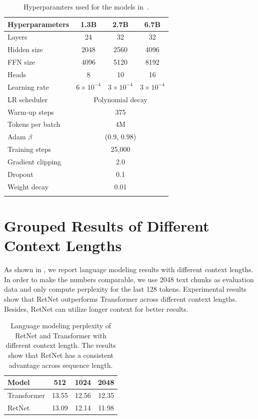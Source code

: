 \documentclass{article}
\newcommand\our{RetNet}
\begin{document}
\begin{table}[ht]
\centering
\begin{tabular}{lccc}
\toprule
\bf Hyperparameters & \bf 1.3B & \bf 2.7B & \bf 6.7B \\
\midrule
Layers & 24 & 32 & 32 \\
Hidden size & 2048 & 2560 & 4096 \\
FFN size & 4096 & 5120 & 8192 \\
Heads & 8 & 10 & 16 \\
\midrule
Learning rate & $6\times10^{-4}$ & $3\times10^{-4}$ & $3\times10^{-4}$ \\
LR scheduler & \multicolumn{3}{c}{Polynomial decay} \\
Warm-up steps & \multicolumn{3}{c}{375} \\
Tokens per batch & \multicolumn{3}{c}{4M} \\
Adam $\beta$ & \multicolumn{3}{c}{(0.9, 0.98)} \\
Training steps & \multicolumn{3}{c}{25,000} \\
\midrule
Gradient clipping & \multicolumn{3}{c}{2.0} \\
Dropout & \multicolumn{3}{c}{0.1} \\
Weight decay & \multicolumn{3}{c}{0.01} \\
\bottomrule
\\
\end{tabular}
\caption{Hyperparamters used for the models in~.
}
\end{table}

\section{Grouped Results of Different Context Lengths}
\label{app:ppl:length}

As shown in , we report language modeling results with different context lengths.
In order to make the numbers comparable, we use 2048 text chunks as evaluation data and only compute perplexity for the last 128 tokens.
Experimental results show that \our{} outperforms Transformer across different context lengths.
Besides, \our{} can utilize longer context for better results.

\begin{table}[ht]
\centering
\begin{tabular}{lccc}
\toprule
\bf Model & \bf 512 & \bf 1024 & \bf 2048 \\
\midrule
Transformer & 13.55 & 12.56 & 12.35 \\
\our{} & 13.09 & 12.14 & 11.98 \\
\bottomrule
\end{tabular}
\caption{Language modeling perplexity of \our{} and Transformer with different context length.
The results show that \our{} has a consistent advantage across sequence length.
}
\label{tbl:ppl:length}
\end{table}
\end{document}
